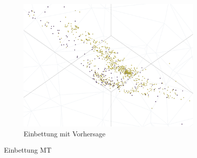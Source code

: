 \begin{figure}[h]
\begin{subfigure}[c]{0.6\textwidth}
		\includegraphics[width=1\textwidth, center]{bilder/Hauptteil/MT_Grapple/emb_res.png}
		\caption{Einbettung mit Vorhersage}
		\label{img:Emb_MT_Vorhersage}	
	\end{subfigure}
		\caption{Einbettung MT}
		\label{img:EmbeddingMT}
	\end{figure}

